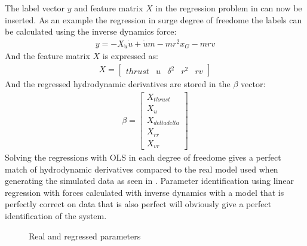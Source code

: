 \documentclass[review]{elsarticle}
\begin{document}
\sphinxAtStartPar
The label vector \(y\) and feature matrix \(X\) in the regression problem in {\hyperref[\detokenize{03.01_inverse_dynamics:equation-eqregression}]{}} can now be inserted. As an example the regression in surge degree of freedome the labels can be calculated using the inverse dynamics force:
\begin{equation}\label{equation:03.01_inverse_dynamics:diff_eq_X_y}
\begin{split}\displaystyle y = - X_{\dot{u}} \dot{u} + \dot{u} m - m r^{2} x_{G} - m r v\end{split}
\end{equation}
\sphinxAtStartPar
And the feature matrix \(X\) is expressed as:
\begin{equation}\label{equation:03.01_inverse_dynamics:diff_eq_X_X}
\begin{split}\displaystyle X = \left[\begin{matrix}thrust & u & \delta^{2} & r^{2} & r v\end{matrix}\right]\end{split}
\end{equation}
\sphinxAtStartPar
And the regressed hydrodynamic derivatives are stored in the \(\beta\) vector:
\begin{equation}\label{equation:03.01_inverse_dynamics:diff_eq_X_beta}
\begin{split}\displaystyle \beta = \left[\begin{matrix}X_{thrust}\\X_{u}\\X_{deltadelta}\\X_{rr}\\X_{vr}\end{matrix}\right]\end{split}
\end{equation}
\sphinxAtStartPar
Solving the regressions with OLS in each degree of freedome gives a perfect match of hydrodynamic derivatives compared to the real model used when generating the simulated data as seen in {\hyperref[\detokenize{03.01_inverse_dynamics:fig-bar-parameters}]{}}. Parameter identification using linear regression with forces calculated with inverse dynamics with a model that is perfectly correct on data that is also perfect will obviously give a perfect identification of the system.

\begin{figure}[htbp]
\centering
\capstart

\noindent{}
\caption{Real and regressed parameters}\label{\detokenize{03.01_inverse_dynamics:fig-bar-parameters}}\end{figure}
\end{document}
